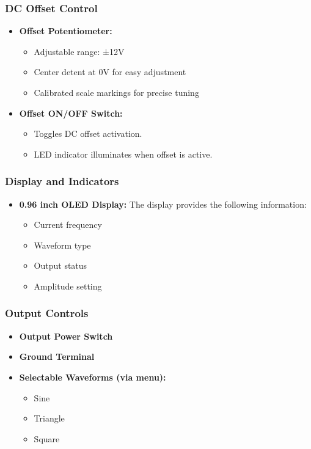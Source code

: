 \documentclass[12pt,a4paper]{article}
\begin{document}
\subsubsection{DC Offset Control}
\begin{itemize}
    \item \textbf{Offset Potentiometer:}
    \begin{itemize}
        \item Adjustable range: ±12V
        \item Center detent at 0V for easy adjustment
        \item Calibrated scale markings for precise tuning
    \end{itemize}
    \item \textbf{Offset ON/OFF Switch:}
    \begin{itemize}
        \item Toggles DC offset activation.
        \item LED indicator illuminates when offset is active.
    \end{itemize}
\end{itemize}

\subsubsection{Display and Indicators}
\begin{itemize}
    \item \textbf{0.96 inch OLED Display:} The display provides the following information: \begin{itemize}
        \item Current frequency
        \item Waveform type
        \item Output status
        \item Amplitude setting
    \end{itemize}
\end{itemize}

\subsubsection{Output Controls}
\begin{itemize}
    \item \textbf{Output Power Switch} 
    \item \textbf{Ground Terminal}
    \item \textbf{Selectable Waveforms (via menu):}
    \begin{itemize}
        \item Sine
        \item Triangle
        \item Square
    \end{itemize}
\end{itemize}
\end{document}

